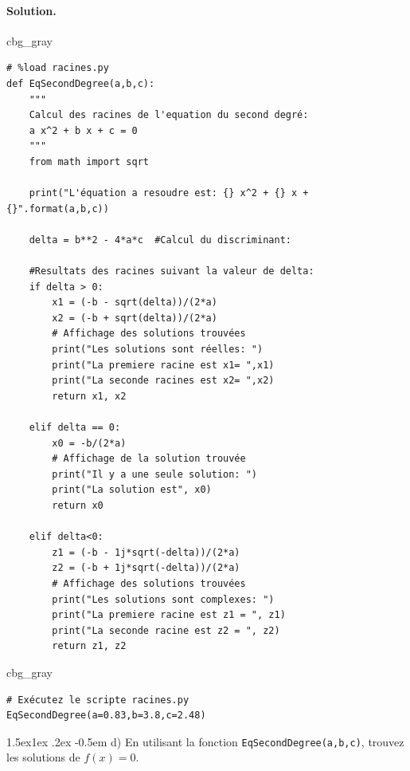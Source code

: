 \documentclass[%
oneside,                 %
final,                   %
10pt,french]{article}
\makeatletter
\newenvironment{_cod_tight}[1]{
   \def\FrameCommand{\colorbox{#1}}
   \FrameRule0.6pt\MakeFramed {\FrameRestore}\vskip3mm}
   {\vskip0mm\endMakeFramed}
\newenvironment{cod}[1]{
\bgroup\rmfamily
\fboxsep=0mm\relax
\begin{_cod_tight}{#1}
\list{}{\parsep=-2mm\parskip=0mm\topsep=0pt\leftmargin=2mm
\rightmargin=2\leftmargin\leftmargin=4pt\relax}
\item\relax}
{\endlist\end{_cod_tight}\egroup}
\newenvironment{doconceexercise}{}{}
\newcommand\subex{\@startsection{paragraph}{4}{\z@}%
                  {1.5ex\@plus1ex \@minus.2ex}%
                  {-0.5em}%
                  {\normalfont\normalsize\bfseries}}
\makeatother
\begin{document}
\begin{doconceexercise}
\noindent
\paragraph{Solution.}
\begin{cod}{cbg_gray}\begin{verbatim}
# %load racines.py
def EqSecondDegree(a,b,c):
    """
    Calcul des racines de l'equation du second degré:
    a x^2 + b x + c = 0
    """
    from math import sqrt

    print("L'équation a resoudre est: {} x^2 + {} x + {}".format(a,b,c))

    delta = b**2 - 4*a*c  #Calcul du discriminant:

    #Resultats des racines suivant la valeur de delta:
    if delta > 0:
        x1 = (-b - sqrt(delta))/(2*a)
        x2 = (-b + sqrt(delta))/(2*a)
        # Affichage des solutions trouvées
        print("Les solutions sont réelles: ")
        print("La premiere racine est x1= ",x1)
        print("La seconde racines est x2= ",x2)
        return x1, x2

    elif delta == 0:
        x0 = -b/(2*a)
        # Affichage de la solution trouvée
        print("Il y a une seule solution: ")
        print("La solution est", x0)
        return x0

    elif delta<0:
        z1 = (-b - 1j*sqrt(-delta))/(2*a)
        z2 = (-b + 1j*sqrt(-delta))/(2*a)
        # Affichage des solutions trouvées
        print("Les solutions sont complexes: ")
        print("La premiere racine est z1 = ", z1)
        print("La seconde racine est z2 = ", z2)
        return z1, z2
\end{verbatim}
\end{cod}
\noindent

\begin{cod}{cbg_gray}\begin{verbatim}
# Exécutez le scripte racines.py
EqSecondDegree(a=0.83,b=3.8,c=2.48)
\end{verbatim}
\end{cod}
\noindent


\subex{d)}
En utilisant la fonction \texttt{EqSecondDegree(a,b,c)}, trouvez les solutions de $f(x) = 0$.



\end{doconceexercise}
\end{document}

